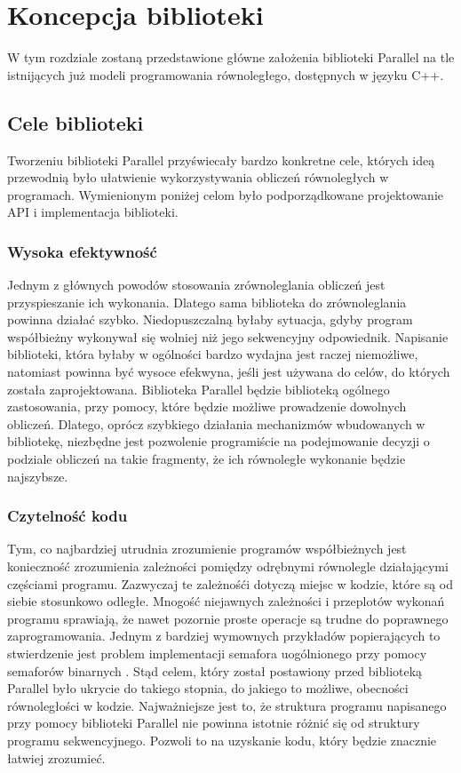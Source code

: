 
\chapter{Koncepcja biblioteki}\label{r:koncepcja}

  W tym rozdziale zostaną przedstawione główne założenia biblioteki Parallel na tle istnijących już modeli programowania równoległego, dostępnych w języku C++.

\section{Cele biblioteki}

  Tworzeniu biblioteki Parallel przyświecały bardzo konkretne cele, których ideą przewodnią było ułatwienie wykorzystywania obliczeń równoległych w programach.
  Wymienionym poniżej celom było podporządkowane projektowanie API i implementacja biblioteki.

\subsection{Wysoka efektywność}

  Jednym z głównych powodów stosowania zrównoleglania obliczeń jest przyspieszanie ich wykonania. Dlatego sama biblioteka do zrównoleglania powinna działać szybko.
  Niedopuszczalną byłaby sytuacja, gdyby program współbieżny wykonywał się wolniej niż jego sekwencyjny odpowiednik.
  Napisanie biblioteki, która byłaby w ogólności bardzo wydajna jest raczej niemożliwe, natomiast powinna być wysoce efekwyna, jeśli jest używana do celów, do których została zaprojektowana.
  Biblioteka Parallel będzie biblioteką ogólnego zastosowania, przy pomocy, które będzie możliwe prowadzenie dowolnych obliczeń.
  Dlatego, oprócz szybkiego działania mechanizmów wbudowanych w bibliotekę, niezbędne jest pozwolenie programiście na podejmowanie decyzji o podziale obliczeń na takie fragmenty, że ich równoległe wykonanie będzie najszybsze.

\subsection{Czytelność kodu}

  Tym, co najbardziej utrudnia zrozumienie programów współbieżnych jest konieczność zrozumienia zależności pomiędzy odrębnymi równolegle działającymi częściami programu.
  Zazwyczaj te zależnośći dotyczą miejsc w kodzie, które są od siebie stosunkowo odległe.
  Mnogość niejawnych zależności i przeplotów wykonań programu sprawiają, że nawet pozornie proste operacje są trudne do poprawnego zaprogramowania.
  Jednym z bardziej wymownych przykładów popierających to stwierdzenie jest problem implementacji semafora uogólnionego przy pomocy semaforów binarnych \cite{gensem}.
  Stąd celem, który został postawiony przed biblioteką Parallel było ukrycie do takiego stopnia, do jakiego to możliwe, obecności równoległości w kodzie.
  Najważniejsze jest to, że struktura programu napisanego przy pomocy biblioteki Parallel nie powinna istotnie różnić się od struktury programu sekwencyjnego.
  Pozwoli to na uzyskanie kodu, który będzie znacznie łatwiej zrozumieć.

